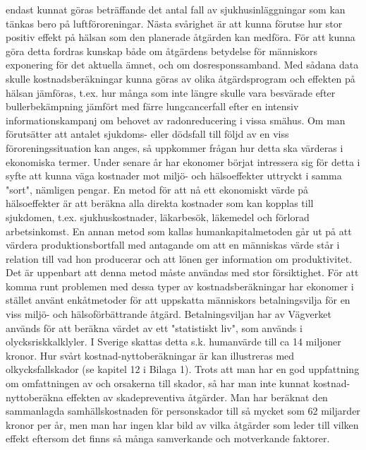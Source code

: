 endast kunnat göras beträffande det antal fall av sjukhusinläggningar som kan tänkas bero på luftföroreningar.
Nästa svårighet är att kunna förutse hur stor positiv effekt på hälsan som den planerade åtgärden kan medföra. För att kunna göra detta fordras kunskap både om åtgärdens betydelse för människors exponering för det aktuella ämnet, och om dosresponssamband. Med sådana data skulle kostnadsberäkningar kunna göras av olika åtgärdsprogram och effekten på hälsan jämföras, t.ex. hur många som inte längre skulle vara besvärade efter bullerbekämpning jämfört med färre lungcancerfall efter en intensiv informationskampanj om behovet av radonreducering i vissa smähus.
Om man förutsätter att antalet sjukdoms- eller dödsfall till följd av en viss föroreningssituation kan anges, så uppkommer frågan hur detta ska värderas i ekonomiska termer. Under senare år har ekonomer börjat intressera sig för detta i syfte att kunna väga kostnader mot miljö- och hälsoeffekter uttryckt i samma "sort", nämligen pengar. En metod för att nå ett ekonomiskt värde på hälsoeffekter är att beräkna alla direkta kostnader som kan kopplas till sjukdomen, t.ex. sjukhuskostnader, läkarbesök, läkemedel och förlorad arbetsinkomst. En annan metod som kallas humankapitalmetoden går ut på att värdera produktionsbortfall med antagande om att en människas värde står i relation till vad hon producerar och att lönen ger information om produktivitet. Det är uppenbart att denna metod måste användas med stor försiktighet. För att komma runt problemen med dessa typer av kostnadsberäkningar har ekonomer i stället använt enkåtmetoder för att uppskatta människors betalningsvilja för en viss miljö- och hälsoförbättrande åtgärd.
Betalningsviljan har av Vägverket används för att beräkna värdet av ett "statistiskt liv", som används i olycksriskkalklyler. I Sverige skattas detta s.k. humanvärde till ca 14 miljoner kronor.
Hur svårt kostnad-nyttoberäkningar är kan illustreras med olkycksfallskador (se kapitel 12 i Bilaga 1). Trots att man har en god uppfattning om omfattningen av och orsakerna till skador, så har man inte kunnat kostnad-nyttoberäkna effekten av skadepreventiva åtgärder. Man har beräknat den sammanlagda samhällskostnaden för personskador till så mycket som 62 miljarder kronor per år, men man har ingen klar bild av vilka åtgärder som leder till vilken effekt eftersom det finns så många samverkande och motverkande faktorer.

